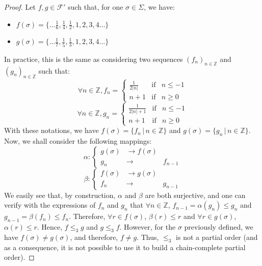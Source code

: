 \documentclass[a4paper,10pt]{llncs}
\def\ZZ {{\mathbb Z}}
\begin{document}
\begin{proof}
Let $f,g \in \mathcal{F}'$ such that, for one $\sigma \in \Sigma$, we have:
\begin{itemize}
\item $f(\sigma) = \{\dots\frac{1}{6}, \frac{1}{4}, \frac{1}{2}, 1, 2, 3, 4 \dots\}$
\item $g(\sigma) = \{\dots\frac{1}{7}, \frac{1}{5}, \frac{1}{3}, 1, 2, 3, 4 \dots\}$
\end{itemize}
In practice, this is the same as considering two sequences $(f_n)_{n \in \ZZ}$ and $(g_n)_{n \in \ZZ}$ such that:
\begin{equation}
\forall n \in \ZZ, f_n=
\left\lbrace
\begin{array}{ccc}
\frac{1}{2|n|}  & \mbox{if} & n \leq -1\\
n+1 & \mbox{if} & n \geq 0
\end{array}\right.
\end{equation}
\begin{equation}
\forall n \in \ZZ, g_n=
\left\lbrace
\begin{array}{ccc}
\frac{1}{2|n|+1}  & \mbox{if} & n \leq -1\\
n+1 & \mbox{if} & n \geq 0
\end{array}\right.
\end{equation}
With these notations, we have $f(\sigma) = \{f_n \,|\, n \in \ZZ\}$ and $g(\sigma) = \{g_n \,|\, n \in \ZZ\}$.
Now, we shall consider the following mappings:
\begin{equation}
\alpha :
\left\lbrace
\begin{array}{ccc}
g(\sigma) & \rightarrow f(\sigma)\\
g_n & \rightarrow & f_{n-1}
\end{array}\right.
\end{equation}
\begin{equation}
\beta :
\left\lbrace
\begin{array}{ccc}
f(\sigma) & \rightarrow g(\sigma)\\
f_n & \rightarrow & g_{n-1}
\end{array}\right.
\end{equation}
We easily see that, by construction, $\alpha$ and $\beta$ are both surjective, and one can verify with the expressions of $f_n$ and $g_n$ that $\forall n \in \ZZ$, $f_{n-1} = \alpha(g_n) \leq g_n$ and $g_{n-1} = \beta(f_n) \leq f_n$. Therefore, $\forall r \in f(\sigma)$, $\beta(r) \leq r$ and $\forall r \in g(\sigma)$, $\alpha(r) \leq r$.\newline
Hence, $f \leq_3 g$ and $g \leq_3 f$. However, for the $\sigma$ previously defined, we have $f(\sigma) \neq g(\sigma)$, and therefore, $f \neq g$.\newline
Thus, $\leq_3$ is not a partial order (and as a consequence, it is not possible to use it to build a chain-complete partial order).
\end{proof}
\end{document}
